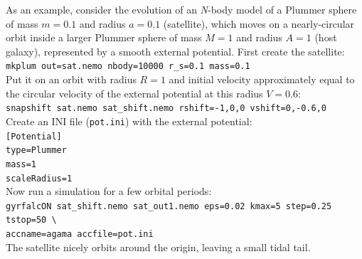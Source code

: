\documentclass[12pt]{article}
\newcommand{\Nbody}{\textsl{N}-body\xspace}
\begin{document}
As an example, consider the evolution of an \Nbody model of a Plummer sphere of mass $m=0.1$ and radius $a=0.1$ (satellite), which moves on a nearly-circular orbit inside a larger Plummer sphere of mass $M=1$ and radius $A=1$ (host galaxy), represented by a smooth external potential. First create the satellite:\\[2mm]
\texttt{mkplum out=sat.nemo nbody=10000 r_s=0.1 mass=0.1}\\[2mm]
Put it on an orbit with radius $R=1$ and initial velocity approximately equal to the circular velocity of the external potential at this radius $V=0.6$:\\[2mm]
\texttt{snapshift sat.nemo sat_shift.nemo rshift=-1,0,0 vshift=0,-0.6,0}\\[2mm]
Create an INI file (\texttt{pot.ini}) with the external potential:\\[2mm]
\texttt{[Potential]\\type=Plummer\\mass=1\\scaleRadius=1}\\[2mm]
Now run a simulation for a few orbital periods:\\[2mm]
\texttt{gyrfalcON sat_shift.nemo sat_out1.nemo eps=0.02 kmax=5 step=0.25 tstop=50 \textbackslash \\
\makebox[7mm]{} accname=agama accfile=pot.ini}\\[2mm]
The satellite nicely orbits around the origin, leaving a small tidal tail.
\end{document}
